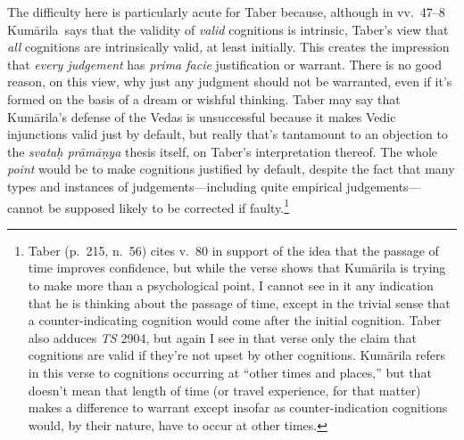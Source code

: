 \documentclass[11pt,letterpaper,oneside]{amsart}
\newcommand{\e}{\emph}
\newcommand{\kum}{Kum\={a}rila}
\begin{document}







The difficulty here is particularly acute for Taber because, although in vv.\ 47--8 \kum\ says that the validity of \e{valid} cognitions is intrinsic, Taber's view that \emph{all} cognitions are intrinsically valid, at least initially. This creates the impression that \emph{every judgement} has \emph{prima facie} justification or warrant. There is no good reason, on this view, why just any judgment should not be warranted, even if it's formed on the basis of a dream or wishful thinking. Taber may say that Kum\=arila's defense of the Vedas is unsuccessful because it makes Vedic injunctions valid just by default, but really that's tantamount to an objection to the \emph{svata\d h pr\=am\=a\d nya} thesis itself, on Taber's interpretation thereof. The whole \emph{point} would be to make cognitions justified by default, despite the fact that many types and instances of judgements---including quite empirical judgements---cannot be supposed likely to be corrected if faulty.\footnote{Taber (p.\ 215, n.\ 56) cites v.\ 80 in support of the idea that the passage of time improves confidence, but while the verse shows that Kum\=arila is trying to make more than a psychological point, I cannot see in it any indication that he is thinking about the passage of time, except in the trivial sense that a counter-indicating cognition would come after the initial cognition. Taber also adduces \emph{TS} 2904, but again I see in that verse only the claim that cognitions are valid if they're not upset by other cognitions. Kum\=arila refers in this verse to cognitions occurring at ``other times and places,'' but that doesn't mean that length of time (or travel experience, for that matter) makes a difference to warrant except insofar as counter-indication cognitions would, by their nature, have to occur at other times.\label{tabertextual}}
\end{document}
